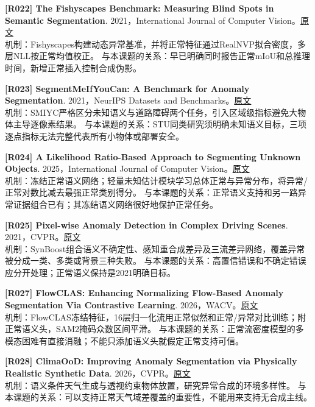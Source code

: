 \documentclass[11pt,a4paper]{article}
\begin{document}
\hypertarget{R022}{}\textbf{[R022] The Fishyscapes Benchmark: Measuring Blind Spots in Semantic Segmentation}. 2021，International Journal of Computer Vision。\href{https://arxiv.org/html/1904.03215}{原文}\\
机制：Fishyscapes构建动态异常基准，并将正常特征通过RealNVP拟合密度，多层NLL按正常均值校正。 与本课题的关系：早已明确同时报告正常mIoU和总推理时间，新增正常插入控制合成伪影。\par\medskip
\hypertarget{R023}{}\textbf{[R023] SegmentMeIfYouCan: A Benchmark for Anomaly Segmentation}. 2021，NeurIPS Datasets and Benchmarks。\href{https://arxiv.org/html/2104.14812}{原文}\\
机制：SMIYC严格区分未知语义与道路障碍两个任务，引入区域级指标避免大物体主导逐像素结果。 与本课题的关系：STU同类研究须明确未知语义目标，三项逐点指标无法完整代表所有小物体或部署安全。\par\medskip
\hypertarget{R024}{}\textbf{[R024] A Likelihood Ratio-Based Approach to Segmenting Unknown Objects}. 2025，International Journal of Computer Vision。\href{https://arxiv.org/html/2409.06424}{原文}\\
机制：冻结正常语义网络；轻量未知估计模块学习总体正常与异常分布，将异常/正常对数比减去最强正常类别得分。 与本课题的关系：正常语义支持和另一路异常证据组合已有；其冻结语义网络很好地保护正常任务。\par\medskip
\hypertarget{R025}{}\textbf{[R025] Pixel-wise Anomaly Detection in Complex Driving Scenes}. 2021，CVPR。\href{https://arxiv.org/pdf/2103.05445}{原文}\\
机制：SynBoost组合语义不确定性、感知重合成差异及三流差异网络，覆盖异常被分成一类、多类或背景三种失败。 与本课题的关系：高置信错误和不确定错误应分开处理；正常语义保持是2021明确目标。\par\medskip
\hypertarget{R027}{}\textbf{[R027] FlowCLAS: Enhancing Normalizing Flow-Based Anomaly Segmentation Via Contrastive Learning}. 2026，WACV。\href{https://arxiv.org/pdf/2411.19888}{原文}\\
机制：FlowCLAS冻结特征，16层归一化流用正常似然和正常/异常对比训练；附正常语义头，SAM2掩码众数区间平滑。 与本课题的关系：正常流密度模型的多模态困难有直接消融；不能只添加语义头就假定正常支持可信。\par\medskip
\hypertarget{R028}{}\textbf{[R028] ClimaOoD: Improving Anomaly Segmentation via Physically Realistic Synthetic Data}. 2026，CVPR。\href{https://arxiv.org/html/2512.02686}{原文}\\
机制：语义条件天气生成与透视约束物体放置，研究异常合成的环境多样性。 与本课题的关系：可以支持正常天气域差覆盖的重要性，不能用来支持无合成主线。\par\medskip
\end{document}
